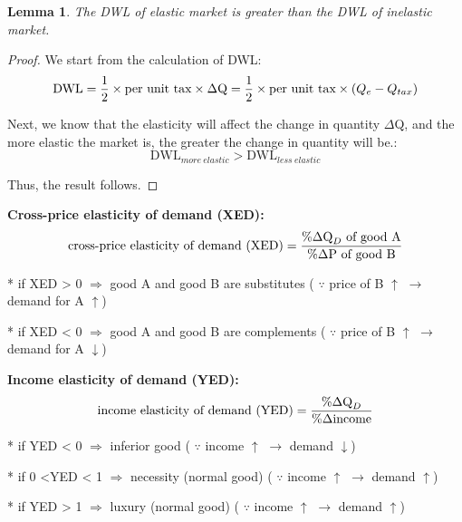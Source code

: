 \documentclass[UTF8]{article}
\newtheorem{lemma}{Lemma}
\begin{document}
\newpage
\noindent

\begin{lemma}
    The DWL of elastic market is greater than the DWL of inelastic market.
\end{lemma}


\begin{proof}
We start from the calculation of DWL:
\[
\text{DWL} = {\displaystyle{1\over2}}\times \text{per unit tax}\times \Delta \text{Q} = {\displaystyle{1\over2}}\times \text{per unit tax} \times (Q_e-Q_{tax})
\]

Next, we know that the elasticity will affect the change in quantity $\Delta$Q, and the more elastic the market is, the greater the change in quantity will be.:
\[
\text{DWL}_{more\ elastic}>\text{DWL}_{less\ elastic}
\]

Thus, the result follows.
\end{proof}


\textbf{Cross-price elasticity of demand (XED):}
\begin{equation}
    \text{cross-price elasticity of demand (XED)} = {{\%\Delta \text{Q}_D\ \text{of good A}}\over \%\Delta \text{P}\ \text{of good B}}
    \nonumber
\end{equation}

* if XED > 0 $\Longrightarrow$ good A and good B are substitutes ( $\because$ price of B $\uparrow$ $\longrightarrow$ demand for A $\uparrow$)    

* if XED < 0 $\Longrightarrow$ good A and good B are complements ( $\because$ price of B $\uparrow$ $\longrightarrow$ demand for A $\downarrow$)

\textbf{Income elasticity of demand (YED):}
\begin{equation}
    \text{income elasticity of demand (YED)} = {{\%\Delta \text{Q}_D}\over \%\Delta \text{income}}
    \nonumber
\end{equation}

* if YED < 0 $\Longrightarrow$ inferior good ( $\because$ income $\uparrow$ $\longrightarrow$ demand $\downarrow$)

* if 0 <YED < 1 $\Longrightarrow$ necessity (normal good) ( $\because$ income $\uparrow$ $\longrightarrow$ demand $\uparrow$)

* if YED > 1 $\Longrightarrow$ luxury (normal good) ( $\because$ income $\uparrow$ $\longrightarrow$ demand $\uparrow$)
\end{document}
